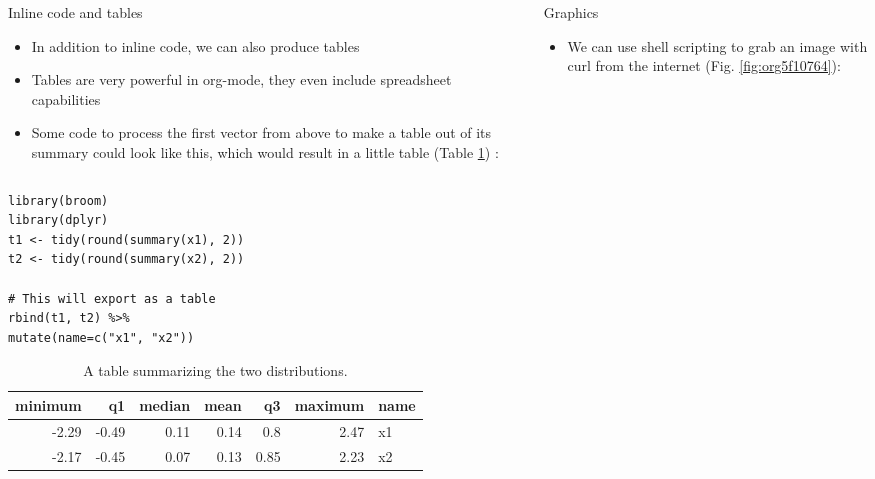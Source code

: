 \documentclass[final]{beamer}
\begin{document}
\begin{frame}[fragile,label={sec:org2358f68}]{}
\begin{columns}
\begin{column}[t]{0.45\columnwidth}
\begin{block}{Inline code and tables}
\begin{itemize}
\item In addition to inline code, we can also produce tables
\item Tables are very powerful in org-mode, they even include spreadsheet
capabilities
\item Some code to process the first vector from above to make a table out
of its summary could look like this, which would result in a little
table (Table \ref{tab:org885d808}) :
\end{itemize}

\begin{columns}
\begin{column}[T]{0.78\columnwidth}
\begin{verbatim}
library(broom)
library(dplyr)
t1 <- tidy(round(summary(x1), 2)) 
t2 <- tidy(round(summary(x2), 2))

# This will export as a table
rbind(t1, t2) %>%
mutate(name=c("x1", "x2"))
\end{verbatim}

\vspace{2cm}

\begin{table}[htbp]
\caption{\label{tab:org885d808}
A table summarizing the two distributions.}
\centering
\begin{tabular}{rrrrrrl}
\hline
minimum & q1 & median & mean & q3 & maximum & name\\
\hline
-2.29 & -0.49 & 0.11 & 0.14 & 0.8 & 2.47 & x1\\
-2.17 & -0.45 & 0.07 & 0.13 & 0.85 & 2.23 & x2\\
\hline
\end{tabular}
\end{table}
\end{column}
\end{columns}
\end{block}
\end{column}

\begin{column}[t]{0.45\columnwidth}
\begin{block}{Graphics}
\begin{itemize}
\item We can use shell scripting to grab an image with curl from the
internet (Fig. \ref{fig:org5f10764}):
\end{itemize}


\end{block}
\end{column}
\end{columns}
\end{frame}
\end{document}
